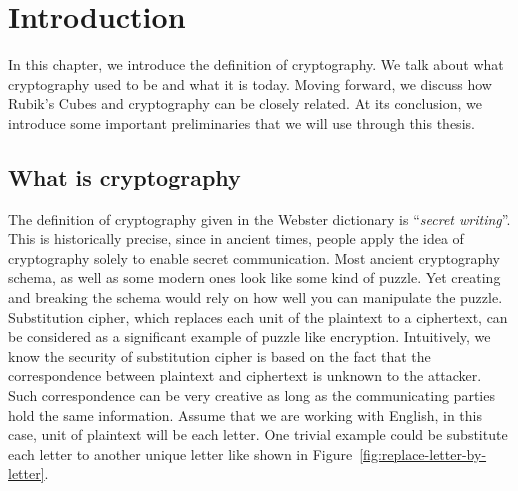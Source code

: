 \doublespacing{}
\setlength{\parindent}{4ex}
\chapter{Introduction}
In this chapter, we introduce the definition of cryptography. We talk about what cryptography used to be and what it is today. Moving forward, we discuss how Rubik's Cubes and cryptography can be closely related. At its conclusion, we introduce some important preliminaries that we will use through this thesis.

\section{What is cryptography}
\par The definition of cryptography given in the Webster dictionary is ``\textit{secret writing}''. This is historically precise, since in ancient times, people apply the idea of cryptography solely to enable secret communication. Most ancient cryptography schema, as well as some modern ones look like some kind of puzzle. Yet creating and breaking the schema would rely on how well you can manipulate the puzzle. Substitution cipher, which replaces each unit of the plaintext to a ciphertext, can be considered as a significant example of puzzle like encryption. Intuitively, we know the security of substitution cipher is based on the fact that the correspondence between plaintext and ciphertext is unknown to the attacker. Such correspondence can be very creative as long as the communicating parties hold the same information. Assume that we are working with English, in this case, unit of plaintext will be each letter. One trivial example could be substitute each letter to another unique letter like shown in Figure~\ref{fig:replace-letter-by-letter}.
